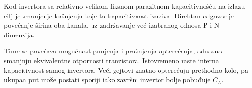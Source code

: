 Kod invertora sa relativno velikom fiksnom parazitnom kapacitivnošću na izlazu cilj je smanjenje kašnjenja koje ta kapacitivnost izaziva. Direktan odgovor je povećanje širina oba kanala, uz zadržavanje već izabranog odnosa P i N dimenzija.

Time se povećava mogućnost punjenja i pražnjenja opterećenja, odnosno smanjuju ekvivalentne otpornosti tranzistora. Istovremeno raste interna kapacitivnost samog invertora. Veći gejtovi znatno opterećuju prethodno kolo, pa ukupan put može postati sporiji iako završni invertor bolje pobuđuje $C_L$.
